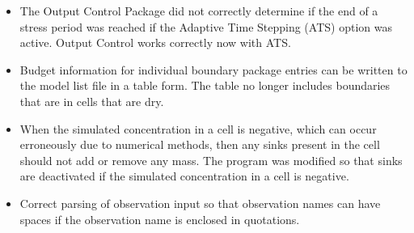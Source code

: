 \documentclass[11pt,twoside,twocolumn]{usgsreport}
\begin{document}
\begin{itemize}
\begin{itemize}
	        \item The Output Control Package did not correctly determine if the end of a stress period was reached if the Adaptive Time Stepping (ATS) option was active.  Output Control works correctly now with ATS.
	        \item Budget information for individual boundary package entries can be written to the model list file in a table form.  The table no longer includes boundaries that are in cells that are dry.
	        \item When the simulated concentration in a cell is negative, which can occur erroneously due to numerical methods, then any sinks present in the cell should not add or remove any mass.  The program was modified so that sinks are deactivated if the simulated concentration in a cell is negative.
	        \item Correct parsing of observation input so that observation names can have spaces if the observation name is enclosed in quotations.
	\end{itemize}


\end{itemize}
\end{document}
